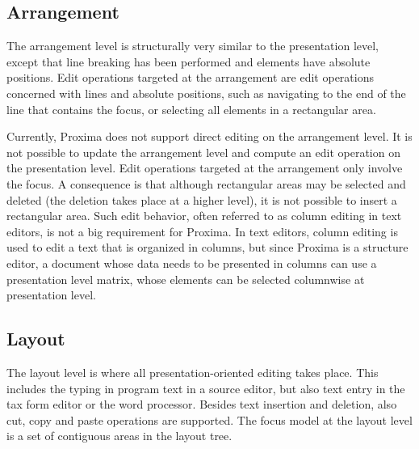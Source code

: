  
%									
\subsection{Arrangement}

The arrangement level is structurally very similar to the presentation level, except that line breaking has been performed and elements have absolute positions. Edit operations targeted at the arrangement are edit operations concerned with lines and absolute positions, such as navigating to the end of the line that contains the focus, or selecting all elements in a rectangular area.

Currently, Proxima does not support direct editing on the arrangement level. It is not possible to update the arrangement level and compute an edit operation on the presentation level. Edit operations targeted at the arrangement only involve the focus. A consequence is that although rectangular areas may be selected and deleted (the deletion takes place at a higher level), it is not possible to insert a rectangular area. Such edit behavior, often referred to as column editing in text editors, is not a big requirement for Proxima. In text editors, column editing is used to edit a text that is organized in columns, but since Proxima is a structure editor, a document whose data needs to be presented in columns can use a presentation level matrix, whose elements can be selected columnwise at presentation level.

 
 
%									
\subsection{Layout}

The layout level is where all presentation-oriented editing takes place. This includes the typing in program text in a source editor, but also text entry in the tax form editor or the word processor. Besides text insertion and deletion, also cut, copy and paste operations are supported. The focus model at the layout level is a set of contiguous areas in the layout tree.
 
